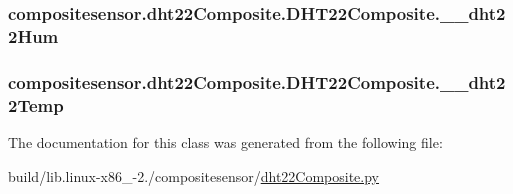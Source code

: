 \subsubsection[{\+\_\+\+\_\+dht22\+Hum}]{\setlength{\rightskip}{0pt plus 5cm}compositesensor.\+dht22\+Composite.\+D\+H\+T22\+Composite.\+\_\+\+\_\+dht22\+Hum\hspace{0.3cm}{\ttfamily [private]}}\label{classcompositesensor_1_1dht22Composite_1_1DHT22Composite_aaa4c4d8c52a15e4d0195efb3719a3b25}
\hypertarget{classcompositesensor_1_1dht22Composite_1_1DHT22Composite_a84d82258d15d29cfb6ce13681eadaa80}{}
\subsubsection[{\+\_\+\+\_\+dht22\+Temp}]{\setlength{\rightskip}{0pt plus 5cm}compositesensor.\+dht22\+Composite.\+D\+H\+T22\+Composite.\+\_\+\+\_\+dht22\+Temp\hspace{0.3cm}{\ttfamily [private]}}\label{classcompositesensor_1_1dht22Composite_1_1DHT22Composite_a84d82258d15d29cfb6ce13681eadaa80}


The documentation for this class was generated from the following file\+:\begin{DoxyCompactItemize}
\item 
build/lib.\+linux-\/x86\+\_-\/2./compositesensor/\hyperlink{build_2lib_8linux-x86__64-2_87_2compositesensor_2dht22Composite_8py}{dht22\+Composite.\+py}\end{DoxyCompactItemize}
